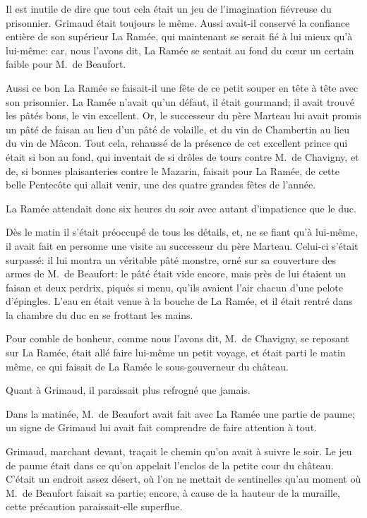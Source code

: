 Il est inutile de dire que tout cela était un jeu de l'imagination fiévreuse du prisonnier. Grimaud était toujours le même. Aussi avait-il conservé la confiance entière de son supérieur La Ramée, qui maintenant se serait fié à lui mieux qu'à lui-même: car, nous l'avons dit, La Ramée se sentait au fond du cœur un certain faible pour M.~de Beaufort.

Aussi ce bon La Ramée se faisait-il une fête de ce petit souper en tête à tête avec son prisonnier. La Ramée n'avait qu'un défaut, il était gourmand; il avait trouvé les pâtés bons, le vin excellent. Or, le successeur du père Marteau lui avait promis un pâté de faisan au lieu d'un pâté de volaille, et du vin de Chambertin au lieu du vin de Mâcon. Tout cela, rehaussé de la présence de cet excellent prince qui était si bon au fond, qui inventait de si drôles de tours contre M.~de Chavigny, et de, si bonnes plaisanteries contre le Mazarin, faisait pour La Ramée, de cette belle Pentecôte qui allait venir, une des quatre grandes fêtes de l'année.

La Ramée attendait donc six heures du soir avec autant d'impatience que le duc.

Dès le matin il s'était préoccupé de tous les détails, et, ne se fiant qu'à lui-même, il avait fait en personne une visite au successeur du père Marteau. Celui-ci s'était surpassé: il lui montra un véritable pâté monstre, orné sur sa couverture des armes de M.~de Beaufort: le pâté était vide encore, mais près de lui étaient un faisan et deux perdrix, piqués si menu, qu'ils avaient l'air chacun d'une pelote d'épingles. L'eau en était venue à la bouche de La Ramée, et il était rentré dans la chambre du duc en se frottant les mains.

Pour comble de bonheur, comme nous l'avons dit, M.~de Chavigny, se reposant sur La Ramée, était allé faire lui-même un petit voyage, et était parti le matin même, ce qui faisait de La Ramée le sous-gouverneur du château.

Quant à Grimaud, il paraissait plus refrogné que jamais.

Dans la matinée, M.~de Beaufort avait fait avec La Ramée une partie de paume; un signe de Grimaud lui avait fait comprendre de faire attention à tout.

Grimaud, marchant devant, traçait le chemin qu'on avait à suivre le soir. Le jeu de paume était dans ce qu'on appelait l'enclos de la petite cour du château. C'était un endroit assez désert, où l'on ne mettait de sentinelles qu'au moment où M.~de Beaufort faisait sa partie; encore, à cause de la hauteur de la muraille, cette précaution paraissait-elle superflue.

